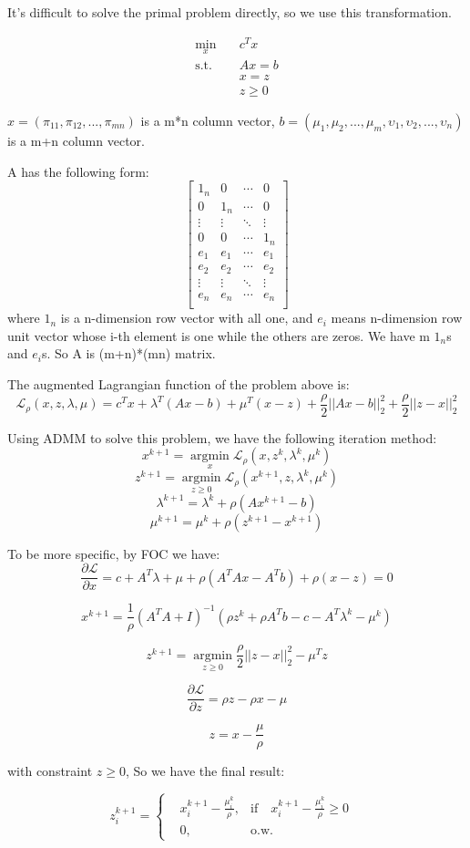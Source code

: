 \documentclass{article}
\begin{document}
	It's difficult to solve the primal problem directly, so we use this transformation.
	
	\[\begin{split}\min\limits_x&\quad c^Tx\\
	\text{s.t.}&\quad Ax=b\\
	&\quad x = z\\
	&\quad z\geq0\end{split}
	\]
	
	$x = (\pi_{11},\pi_{12},...,\pi_{mn})$ is a m*n column vector, $b = (\mu_1,\mu_2,...,\mu_m,\upsilon_1,\upsilon_2,...,\upsilon_n)$ is a m+n column vector.
	
	A has the following form:
	\[\left[\begin{matrix}
		1_n&0&\cdots&0\\
		0&1_n&\cdots&0\\
		\vdots&\vdots&\ddots&\vdots\\
		0&0&\cdots&1_n\\
		e_1&e_1&\cdots&e_1\\
		e_2&e_2&\cdots&e_2\\
		\vdots&\vdots&\ddots&\vdots\\
			e_n&e_n&\cdots&e_n\\
		
	\end{matrix}\right]\]
	where $1_n$ is a n-dimension row vector with all one, and $e_i$ means n-dimension row unit vector whose i-th element is one while the others are zeros. We have m $1_n$s and $e_i$s. So A is (m+n)*(mn) matrix.
	
	The augmented Lagrangian function of the problem above is:
	\[\mathcal{L}_\rho(x,z,\lambda,\mu)=c^Tx+\lambda^T(Ax-b)+\mu^T(x-z)+\frac{\rho}{2}||Ax-b||^2_2+\frac{\rho}{2}||z-x||^2_2\]
	
	Using ADMM to solve this problem, we have the following iteration method:
	\[x^{k+1} =\mathop{ \text{argmin}}\limits_x\mathcal{L}_\rho(x,z^k,\lambda^k,\mu^k)\]
	\[z^{k+1} =\mathop{ \text{argmin}}\limits_{z\geq0}\mathcal{L}_\rho(x^{k+1},z,\lambda^k,\mu^k)\]
	\[\lambda^{k+1}=\lambda^k+\rho(Ax^{k+1}-b)\]
	\[\mu^{k+1}=\mu^k+\rho(z^{k+1}-x^{k+1})\]
	
	To be more specific, by FOC we have:
	\[\frac{\partial{\mathcal{L}}}{\partial{x}}=c+A^T\lambda+\mu+\rho(A^TAx-A^Tb)+\rho(x-z)=0\]
	
	\[x^{k+1}=\frac{1}{\rho}(A^TA+I)^{-1}(\rho z^k+{\rho}A^Tb-c-A^T\lambda^k-\mu^k)\]
	
	\[z^{k+1}=\mathop{\text{argmin}}\limits_{z\geq0} \frac{\rho}{2}||z-x||^2_2-\mu^Tz\]
	
	\[\frac{\partial{\mathcal{L}}}{\partial{z}}=\rho z-\rho x-\mu\]
	
	\[z=x-\frac{\mu}{\rho}\]
	
	with constraint $z\geq0$, So we have the final result:
	
	\[z^{k+1}_i=\left \{\begin{aligned}
	& x_i^{k+1}-\frac{\mu_i^k}{\rho},&\text{if}\quad x_i^{k+1}-\frac{\mu_i^k}{\rho}\geq0&\\
	& 0 ,&\text{o.w.}
	\end{aligned}
	\right. \]
	
	
\end{document}

